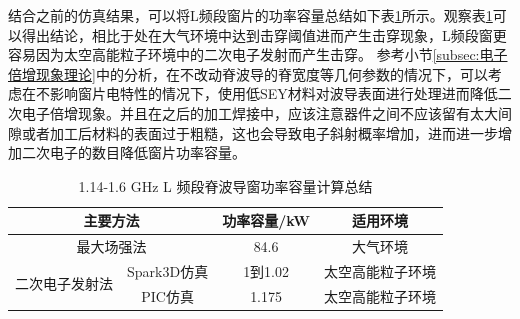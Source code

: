 \documentclass[master]{thesis-uestc}
\begin{document}
结合之前的仿真结果，可以将L频段窗片的功率容量总结如下表\ref{tab:L频段脊波导窗功率容量}所示。观察表\ref{tab:L频段脊波导窗功率容量}可以得出结论，相比于处在大气环境中达到击穿阈值进而产生击穿现象，L频段窗更容易因为太空高能粒子环境中的二次电子发射而产生击穿。
参考小节\ref{subsec:电子倍增现象理论}中的分析，在不改动脊波导的脊宽度等几何参数的情况下，可以考虑在不影响窗片电特性的情况下，使用低SEY材料对波导表面进行处理进而降低二次电子倍增现象。并且在之后的加工焊接中，应该注意器件之间不应该留有太大间隙或者加工后材料的表面过于粗糙，这也会导致电子斜射概率增加，进而进一步增加二次电子的数目降低窗片功率容量。
\begin{table}[!htb]
    \centering
    \caption{1.14-1.6 GHz L 频段脊波导窗功率容量计算总结}
    \label{tab:L频段脊波导窗功率容量}
    \begin{tabular}{@{}cccc@{}}
    \toprule[1.5pt]
    \multicolumn{2}{c}{主要方法}             & 功率容量/kW & 适用环境 \\ \midrule
    \multicolumn{2}{c}{最大场强法}            & 84.6     & 大气环境 \\
    \multirow{2}{*}{二次电子发射法} & Spark3D仿真 & 1到1.02    & 太空高能粒子环境 \\
                             & PIC仿真     & 1.175    & 太空高能粒子环境 \\ \bottomrule[1.5pt]
    \end{tabular}
\end{table}
\end{document}
